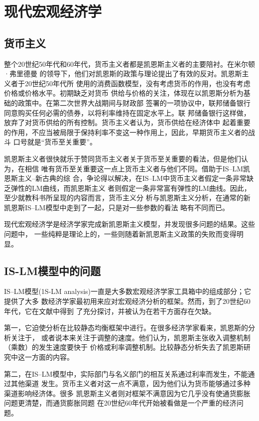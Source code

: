 \section{现代宏观经济学}

\subsection{货币主义}

整个20世纪50年代和60年代，货币主义者都是凯恩斯主义者的主要陪衬。在米尔顿·弗里德曼
的领导下，他们对凯恩斯的政策与理论提出了有效的反对。凯恩斯主义者于20世纪50年代所
使用的消费函数模型，没有考虑货币的作用，也没有考虑价格或价格水平。初期缺乏对货币
供给与价格的关注，体现在以凯恩斯分析为基础的政策中。在第二次世界大战期间与财政部
签署的一项协议中，联邦储备银行同意购买任何必需的债券，以将利率维持在固定水平上。联
邦储备银行这样做，放弃了对货币供给的所有控制。货币主义者认为，货币供给在经济体中
起着重要的作用，不应当被局限于保持利率不变这一种作用上，因此，早期货币主义者的战斗
口号就是“货币至关重要”。

凯恩斯主义者很快就乐于赞同货币主义者关于货币至关重要的看法，但是他们认为，在相信
唯有货币至关重要这一点上货币主义者与他们不同。借助于IS--LM凯恩斯主义--新古典的综
合，争论得以解决，在IS--LM中货币主义者假定一条非常缺乏弹性的LM曲线，而凯恩斯主义
者则假定一条非常富有弹性的LM曲线。因此，至少就教科书所呈现的内容而言，货币主义分
析与凯恩斯主义分析，在通常的新凯恩斯IS--LM模型中走到了一起，只是对一些参数的看法
略有不同而已。

现代宏观经济学是经济学家完成新凯恩斯主义模型，并发现很多问题的结果。这些问题中，
一些纯粹是理论上的，一些则随着新凯恩斯主义政策的失败而变得明显。

\subsection{IS-LM模型中的问题}

IS--LM模型(1S-LM analysis)一直是大多数宏观经济学家工具箱中的组成部分；它提供了大多
数经济学家最初用来应对宏观经济分析的框架。然而，到了20世纪60年代，它在文献中得到
了充分探讨，并被认为在若干方面存在欠缺。

第一，它迫使分析在比较静态均衡框架中进行。在很多经济学家看来，凯恩斯的分析关注于，
或者说本来关注于调整的速度。他们认为，凯恩斯主张收入调整机制（乘数）的发生速度要快于
价格或利率调整机制。比较静态分析失去了凯恩斯研究中这一方面的内容。

第二，在IS--LM模型中，实际部门与名义部门的相互关系通过利率而发生，不能通过其他渠道
发生。货币主义者对这一点不满意，因为他们认为货币能够通过多种渠道影响经济体。很多
凯恩斯主义者则对框架不满意因为它几乎没有使通货膨胀问题更清楚，而通货膨胀同题
在20世纪60年代开始被看做是一个严重的经济问题。

